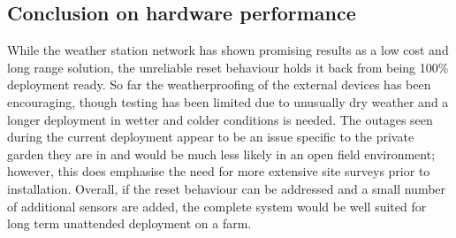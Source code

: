 \subsection{Conclusion on hardware performance}

While the weather station network has shown promising results as a low cost and
long range solution, the unreliable reset behaviour holds it back from being
100\% deployment ready. So far the weatherproofing of the external devices has
been encouraging, though testing has been limited due to unusually dry weather
and a longer deployment in wetter and colder conditions is needed. The outages
seen during the current deployment appear to be an issue specific to the private
garden they are in and would be much less likely in an open field environment;
however, this does emphasise the need for more extensive site surveys prior to
installation. Overall, if the reset behaviour can be addressed and a small
number of additional sensors are added, the complete system would be well suited
for long term unattended deployment on a farm.